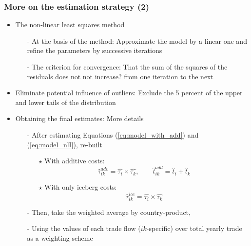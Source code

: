 \documentclass[10 pt,Helvetica, french]{beamer}
\begin{document}
\begin{frame}[label=app_method_2]
\frametitle{More on the estimation strategy (2)}
\begin{itemize}
\item The non-linear least squares method \vspace{0.1cm}
\begin{itemize}
\item[-] At the basis of the method: Approximate the model by a linear one and refine the parameters by successive iterations \vspace{0.1cm}
\item[-] The criterion for convergence: That the sum of the squares of the residuals does not not increase? from one iteration to the next \vspace{0.1cm}
\end{itemize}
\item Eliminate potential influence of outliers: Exclude the 5 percent of the upper and lower tails of the distribution \vspace{0.1cm}
\item Obtaining the final estimates: More details  \vspace{0.1cm}
\begin{itemize}
\item[-] After estimating Equations (\ref{eq:model_with_add}) and (\ref{eq:model_nlI}), re-built \vspace{0.1cm}
\begin{itemize}
\item[$\star$] With additive costs:
$$\widehat{\tau}^{adv}_{ik} = \widehat{\tau_{i}} \times \widehat{\tau_{k}}, \qquad \widehat{t}^{add}_{ik} = \widehat{t}_{i} + \widehat{t}_{k}$$
\item[$\star$] With only iceberg costs:
$$\widehat{\tau}^{ice}_{ik} = \widehat{\tau_{i}} \times \widehat{\tau_{k}}$$
\end{itemize}
\item[-] Then, take the weighted average by country-product, \vspace{0.1cm}
\item[-] Using the values of each trade flow ($ik$-specific) over total yearly trade as a weighting scheme
\end{itemize}
\end{itemize}
\hyperlink{slide_method}{}
\end{frame}
\end{document}
